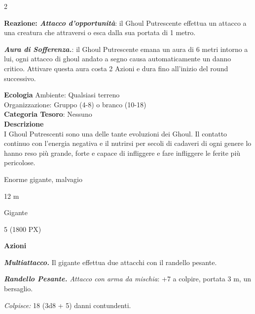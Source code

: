 \begin{multicols}{2}
{\textbf{Reazione: \emph{Attacco d'opportunità}}: il Ghoul Putrescente effettua un attacco a una creatura che attraversi o esca dalla sua portata di 1 metro.

\emph{\textbf{Aura di Sofferenza.}}: il Ghoul Putrescente emana un aura di 6 metri intorno a lui, ogni attacco di ghoul andato a segno causa automaticamente un danno critico. Attivare questa aura costa 2 Azioni e dura fino all'inizio del round successivo.

\textbf{Ecologia}
Ambiente: Qualsiasi terreno\\
Organizzazione: Gruppo (4-8) o branco (10-18)\\
\textbf{Categoria Tesoro}: Nessuno\\
\textbf{Descrizione}\\
I Ghoul Putrescenti sono una delle tante evoluzioni dei Ghoul. Il contatto continuo con l'energia negativa e il nutrirsi per secoli di cadaveri di ogni genere lo hanno reso più grande, forte e capace di infliggere e fare infliggere le ferite più pericolose.

\begin{description}[noitemsep, topsep=0pt, parsep=0pt, partopsep=0pt, itemsep=1pt, leftmargin=2.35cm,  labelwidth=2.2cm, itemindent=0cm, listparindent=0pt] %
\setlength{\baselineskip}{10pt}
\item[\textbf{Taglia/Tipo}] Enorme gigante, malvagio
\item[\textbf{Caratt.}] 
\item[\textbf{Punti Ferita}] 
\item[\textbf{Movimento}] 12 m
\item[\textbf{Tiri Salvez.}] 
\item[\textbf{Linguaggi}] Gigante
\item[\textbf{Sfida}] 5 (1800 PX)
\end{description}
\smallskip

\textbf{Azioni}

\emph{\textbf{Multiattacco.}} Il gigante effettua due attacchi con il randello pesante.

\emph{\textbf{Randello Pesante.} Attacco con arma da mischia}: +7 a colpire, portata 3 m, un bersaglio.

\emph{Colpisce:} 18 (3d8 + 5) danni contundenti.

}
\end{multicols}
